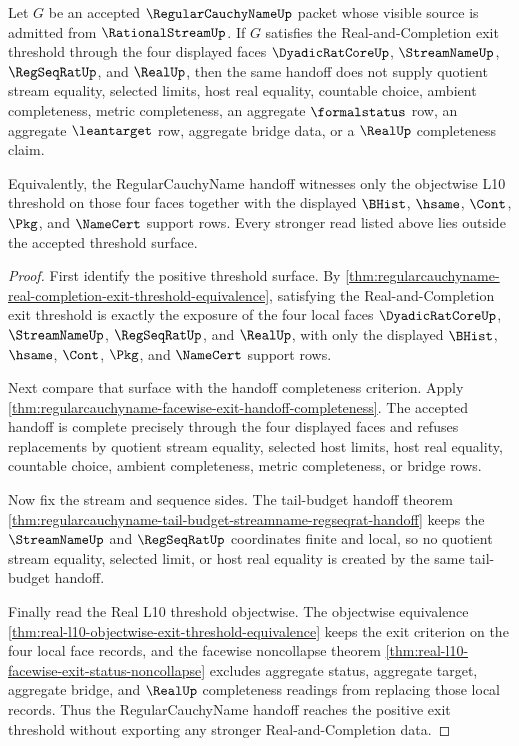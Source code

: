 \begin{theorem}
\label{thm:regularcauchyname-exit-threshold-nonescape-boundary}
Let $G$ be an accepted $\RegularCauchyNameUp$ packet whose visible source is admitted from $\RationalStreamUp$. If $G$ satisfies the Real-and-Completion exit threshold through the four displayed faces $\DyadicRatCoreUp$, $\StreamNameUp$, $\RegSeqRatUp$, and $\RealUp$, then the same handoff does not supply quotient stream equality, selected limits, host real equality, countable choice, ambient completeness, metric completeness, an aggregate $\formalstatus$ row, an aggregate $\leantarget$ row, aggregate bridge data, or a $\RealUp$ completeness claim.

Equivalently, the RegularCauchyName handoff witnesses only the objectwise L10 threshold on those four faces together with the displayed $\BHist$, $\hsame$, $\Cont$, $\Pkg$, and $\NameCert$ support rows. Every stronger read listed above lies outside the accepted threshold surface.
\end{theorem}
\begin{proof}
First identify the positive threshold surface. By \autoref{thm:regularcauchyname-real-completion-exit-threshold-equivalence}, satisfying the Real-and-Completion exit threshold is exactly the exposure of the four local faces $\DyadicRatCoreUp$, $\StreamNameUp$, $\RegSeqRatUp$, and $\RealUp$, with only the displayed $\BHist$, $\hsame$, $\Cont$, $\Pkg$, and $\NameCert$ support rows.

Next compare that surface with the handoff completeness criterion. Apply \autoref{thm:regularcauchyname-facewise-exit-handoff-completeness}. The accepted handoff is complete precisely through the four displayed faces and refuses replacements by quotient stream equality, selected host limits, host real equality, countable choice, ambient completeness, metric completeness, or bridge rows.

Now fix the stream and sequence sides. The tail-budget handoff theorem \autoref{thm:regularcauchyname-tail-budget-streamname-regseqrat-handoff} keeps the $\StreamNameUp$ and $\RegSeqRatUp$ coordinates finite and local, so no quotient stream equality, selected limit, or host real equality is created by the same tail-budget handoff.

Finally read the Real L10 threshold objectwise. The objectwise equivalence \autoref{thm:real-l10-objectwise-exit-threshold-equivalence} keeps the exit criterion on the four local face records, and the facewise noncollapse theorem \autoref{thm:real-l10-facewise-exit-status-noncollapse} excludes aggregate status, aggregate target, aggregate bridge, and $\RealUp$ completeness readings from replacing those local records. Thus the RegularCauchyName handoff reaches the positive exit threshold without exporting any stronger Real-and-Completion data.
\end{proof}

